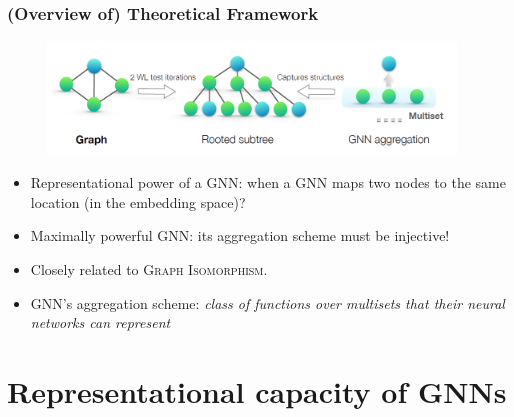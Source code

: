 \documentclass{beamer}
\begin{document}
\begin{frame}
\frametitle{(Overview of) Theoretical Framework}

\begin{figure}[hbt]
	\includegraphics[height=3cm]{fig2.png}
\end{figure}

\begin{itemize}
    \item Representational power of a GNN: when a GNN maps two nodes to the same location (in the embedding space)? \pause
    
    \item Maximally powerful GNN: its aggregation scheme must be \alert{injective}! \pause
    
    \item Closely related to \textsc{Graph Isomorphism}. \pause
    
    \item GNN's aggregation scheme: {\it class of functions over multisets that their neural networks can represent}
\end{itemize}
\end{frame}


\section{Representational capacity of GNNs}
\end{document}
